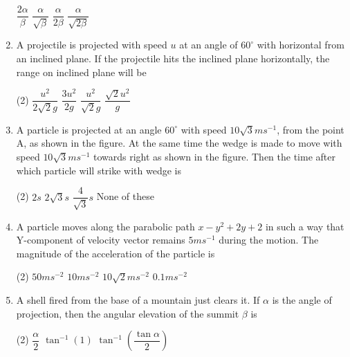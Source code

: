 \documentclass{article}
\renewcommand{\frac}[2]{\dfrac{#1}{#2}}
\begin{document}
\begin{enumerate}
\begin{tasks}
        \task \(\frac{2 \alpha}{\beta} \)
        \task \( \frac{\alpha}{\sqrt{\beta}} \)
        \task \( \frac{\alpha}{2 \beta} \)
        \task \( \frac{\alpha}{\sqrt{2\beta}} \)
    \end{tasks}
    \item A projectile is projected with speed \(u\) at an angle of \(60^{\circ}\) with horizontal from an inclined plane. If the projectile hits the inclined plane horizontally, the range on inclined plane will be
    \begin{tasks}(2)
        \task \(\frac{u^2}{2\sqrt{2}g} \)
        \task \(\frac{3u^2}{2g} \)
        \task \(\frac{u^2}{\sqrt{2}g} \)
        \task \( \frac{\sqrt{2}u^2}{g} \)
    \end{tasks}
    \item A particle is projected at an angle \(60^{\circ}\) with speed \(10 \sqrt{3} ms^{-1}\), from the point A, as shown in the figure. At the same time the wedge is made to move with speed \(10 \sqrt{3} ms^{-1}\) towards right as shown in the figure. Then the time after which particle will strike with wedge is
    \begin{tasks}(2)
        \task \(2s\)
        \task \(2\sqrt{3}s\)
        \task \(\frac{4}{\sqrt{3}}s\)
        \task None of these
    \end{tasks}
    \item A particle moves along the parabolic path \(x - y^2 + 2y + 2\) in such a way that Y-component of velocity vector remains \(5 ms^{-1}\) during the motion. The magnitude of the acceleration of the particle is
    \begin{tasks}(2)
        \task \(50 ms^{-2}\)
        \task \(10 ms^{-2}\)
        \task \(10 \sqrt{2} ms^{-2}\)
        \task \(0.1 ms^{-2}\)
    \end{tasks}
    \item A shell fired from the base of a mountain just clears it. If \(\alpha\) is the angle of projection, then the angular elevation of the summit \(\beta\) is
    \begin{center}
    \end{center}
    \begin{tasks}(2)
        \task \(\frac{\alpha}{2}\)
        \task \( \tan^{-1}\left(1\right) \)
        \task \( \tan^{-1}\left( \frac{\tan \alpha}{2} \right) \)

\end{tasks}
\end{enumerate}
\end{document}
